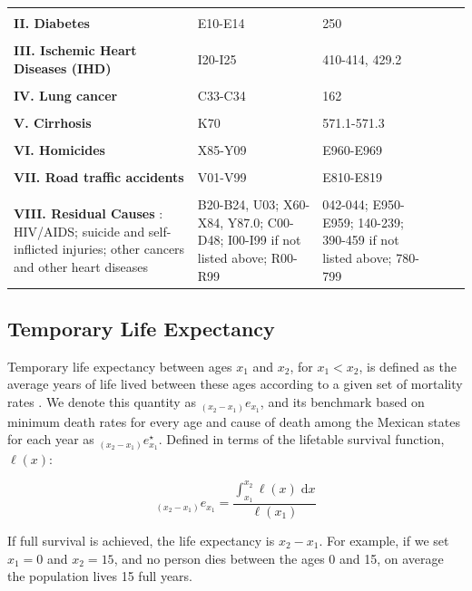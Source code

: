 \documentclass[11.5pt]{article}
\newcommand{\dd}{\; \mathrm{d}}
\begin{document}
{\begin{longtable}{p{8cm}p{4cm}p{4cm}ccc}
 & \\          
 {\bf II. Diabetes}  & E10-E14 & 250 \\      
 & \\
 {\bf III. Ischemic Heart Diseases (IHD)}   & I20-I25 & 410-414, 429.2\\
 & \\                          
{\bf IV. Lung cancer}  & C33-C34 & 162\\
  & \\          
{\bf V. Cirrhosis}&  K70 & 571.1-571.3\\
 & \\          
{\bf VI. Homicides}  & X85-Y09 & E960-E969\\     
 & \\           
 {\bf VII. Road traffic accidents}  & V01-V99 & E810-E819 \\              
 & \\          
{\bf VIII. Residual Causes }:  HIV/AIDS; suicide and self-inflicted injuries; other cancers and other heart diseases & B20-B24, U03; X60-X84, Y87.0; C00-D48; I00-I99 if not listed above; R00-R99 & 042-044; E950-E959; 140-239; 390-459 if not listed above; 780-799
\label{ME_Mex}
\end{longtable}

\newpage

\subsection*{Temporary Life Expectancy}
Temporary life expectancy between ages
$x_1$ and $x_2$, for $x_1<x_2$, is defined as the average years of life lived between these ages according to a given set of mortality rates \citep{arriaga1984}. We denote this quantity as
$_{(x_2-x_1)}e_{x_1}$, and its benchmark based on minimum death rates for every age and cause of death among the Mexican states for each year as $_{(x_2-x_1)}e^{\star}_{x_1}$. Defined in
terms of the lifetable survival function, $\ell(x)$:

\begin{equation}
_{(x_2-x_1)}e_{x_1} = \frac{\int _{x_1}^{x_2} \ell(x) \dd x}{\ell(x_1)}
\end{equation}

If full survival is achieved, the life expectancy is $x_2-x_1$.  For example, if we set $x_1=0$ and $x_2=15$, and no person dies between the ages 0 and 15, on average the population lives 15 full years.


}
\end{document}
